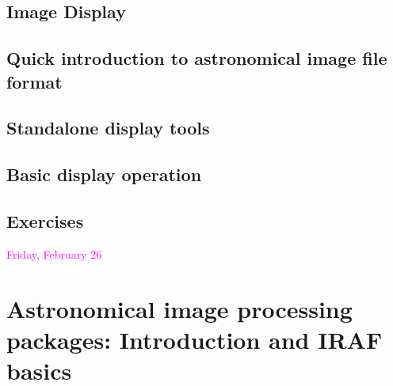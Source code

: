 \documentclass[12pt]{article}
\begin{document}
\subsection*{Image Display}
\subsection*{Quick introduction to astronomical image file format}
\subsection*{Standalone display tools}
\subsection*{Basic display operation}
\subsection*{Exercises}


\textcolor{magenta}{Friday, February 26}

\section*{Astronomical image processing packages: Introduction and
IRAF basics}
\end{document}
